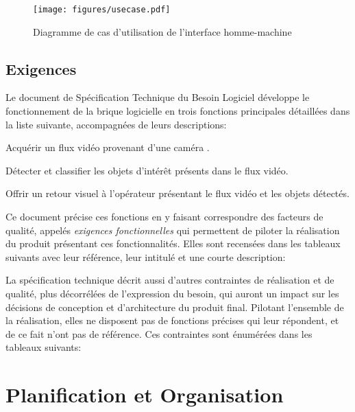 			\begin{figure}[h]
			{
				\centering
				\texttt{[image: figures/usecase.pdf]}
				\caption{Diagramme de cas d'utilisation de l'interface homme-machine}
				\label{fig:usecase}
			}
			\end{figure}

		\subsection{Exigences}

			Le document de Spécification Technique du Besoin Logiciel développe le fonctionnement de la brique logicielle en trois fonctions principales détaillées dans la liste suivante, accompagnées de leurs descriptions:
			\begin{description}[noitemsep, before={\setcounter{descriptcount}{0}},font=\bfseries\stepcounter{descriptcount}\thedescriptcount.~]
				\item[Acquisition Vidéo:] Acquérir un flux vidéo provenant d’une caméra \degre.
				\item[Détection:] Détecter et classifier les objets d’intérêt présents dans le flux vidéo.
				\item[Retour visuel:] Offrir un retour visuel à l’opérateur présentant le flux vidéo et les objets détectés.
			\end{description}
			Ce document précise ces fonctions en y faisant correspondre des facteurs de qualité, appelés \emph{exigences fonctionnelles} qui permettent de piloter la réalisation du produit présentant ces fonctionnalités. Elles sont recensées dans les tableaux suivants avec leur référence, leur intitulé et une courte description:
			
			
			\bigskip

			La spécification technique décrit aussi d'autres contraintes de réalisation et de qualité, plus décorrélées de l'expression du besoin, qui auront un impact sur les décisions de conception et d'architecture du produit final. Pilotant l'ensemble de la réalisation, elles ne disposent pas de fonctions précises qui leur répondent, et de ce fait n'ont pas de référence. Ces contraintes sont énumérées dans les tableaux suivants:
			
			
			

	\section{Planification et Organisation}

